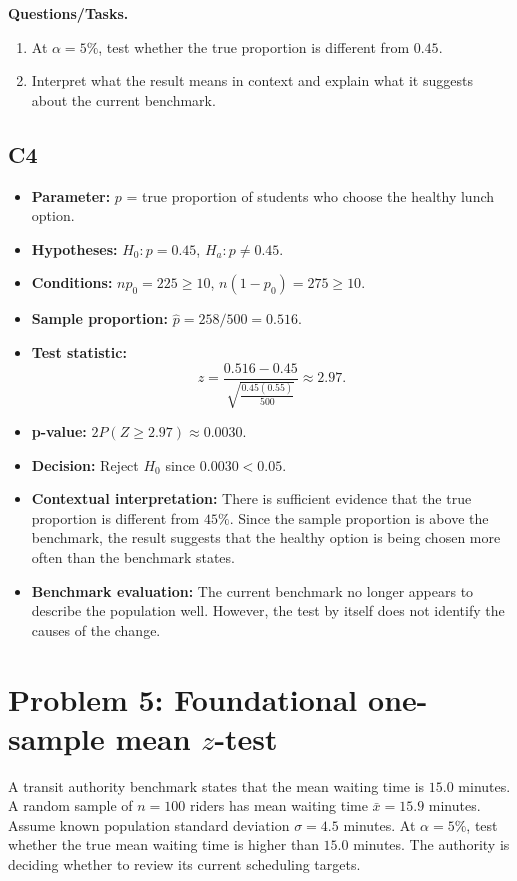 	\textbf{Questions/Tasks.}
	\begin{enumerate}
		\item[(a)] At \(\alpha=5\%\), test whether the true proportion is different from \(0.45\).
		\item[(b)] Interpret what the result means in context and explain what it suggests about the current benchmark.
	\end{enumerate}
	
	\subsection*{C4}
	\begin{itemize}
		\item \textbf{Parameter:} \(p\) = true proportion of students who choose the healthy lunch option.
		\item \textbf{Hypotheses:} \(H_0:p=0.45\), \(H_a:p\ne0.45\).
		\item \textbf{Conditions:} \(np_0=225\ge10\), \(n(1-p_0)=275\ge10\).
		\item \textbf{Sample proportion:} \(\hat p=258/500=0.516\).
		\item \textbf{Test statistic:}
		\[
		z=\frac{0.516-0.45}{\sqrt{\frac{0.45(0.55)}{500}}}\approx2.97.
		\]
		\item \textbf{p-value:} \(2P(Z\ge2.97)\approx0.0030\).
		\item \textbf{Decision:} Reject \(H_0\) since \(0.0030<0.05\).
		\item \textbf{Contextual interpretation:} There is sufficient evidence that the true proportion is different from \(45\%\). Since the sample proportion is above the benchmark, the result suggests that the healthy option is being chosen more often than the benchmark states.
		\item \textbf{Benchmark evaluation:} The current benchmark no longer appears to describe the population well. However, the test by itself does not identify the causes of the change.
	\end{itemize}
	
	\begin{center}
	\end{center}
	
	\section{Problem 5: Foundational one-sample mean \texorpdfstring{\(z\)}{z}-test}
	A transit authority benchmark states that the mean waiting time is \(15.0\) minutes. A random sample of \(n=100\) riders has mean waiting time \(\bar x=15.9\) minutes. Assume known population standard deviation \(\sigma=4.5\) minutes. At \(\alpha=5\%\), test whether the true mean waiting time is higher than \(15.0\) minutes. The authority is deciding whether to review its current scheduling targets.
	
